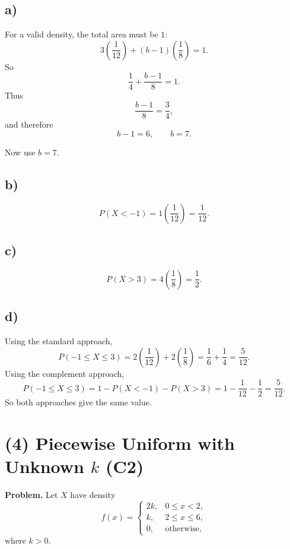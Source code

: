 \subsection*{a)}
For a valid density, the total area must be $1$:
\[
3\left(\frac{1}{12}\right)+(b-1)\left(\frac{1}{8}\right)=1.
\]
So
\[
\frac{1}{4}+\frac{b-1}{8}=1.
\]
Thus
\[
\frac{b-1}{8}=\frac{3}{4},
\]
and therefore
\[
b-1=6,
\qquad
b=7.
\]

Now use $b=7$.


\subsection*{b)}
\[
P(X<-1)=1\left(\frac{1}{12}\right)=\frac{1}{12}.
\]


\subsection*{c)}
\[
P(X>3)=4\left(\frac{1}{8}\right)=\frac{1}{2}.
\]


\subsection*{d)}
Using the standard approach,
\[
P(-1\le X\le 3)=2\left(\frac{1}{12}\right)+2\left(\frac{1}{8}\right)
=\frac{1}{6}+\frac{1}{4}
=\frac{5}{12}.
\]
Using the complement approach,
\[
P(-1\le X\le 3)=1-P(X<-1)-P(X>3)
=1-\frac{1}{12}-\frac{1}{2}
=\frac{5}{12}.
\]
So both approaches give the same value.




\section{(4) Piecewise Uniform with Unknown $k$ (C2)}

\textbf{Problem.}
Let $X$ have density
\[
f(x)=
\begin{cases}
	2k, & 0\le x<2,\\
	k, & 2\le x\le 6,\\
	0, & \text{otherwise,}
\end{cases}
\]
where $k>0$.

